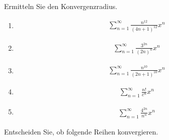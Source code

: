 \documentclass{article}
\begin{document}
Ermitteln Sie den Konvergenzradius.

\begin{multicols}{3}
\begin{enumerate}
    \item \begin{align*}
        \sum_{n = 1}^{\infty}\frac{n^{12}}{(4n + 1)^{12}}x^n
    \end{align*}

    \item \begin{align*}
        \sum_{n = 1}^{\infty}\frac{3^{2n}}{(2n)^{n}}x^n
    \end{align*}

    \item \begin{align*}
        \sum_{n = 1}^{\infty}\frac{n^{10}}{(2n + 1)^10}x^n
    \end{align*}

    \item \begin{align*}
        \sum_{n = 1}^{\infty}\frac{n!}{e^n}x^n
    \end{align*}

    \item \begin{align*}
        \sum_{n = 1}^{\infty}\frac{4^{2n}}{n^n}x^n
    \end{align*}
\end{enumerate}
\end{multicols}

Entscheiden Sie, ob folgende Reihen konvergieren.
\end{document}
